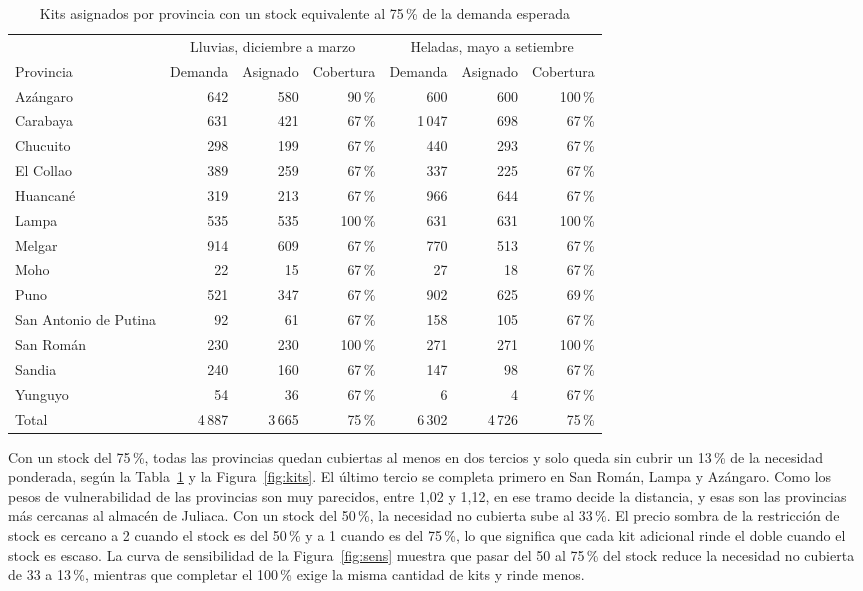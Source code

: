 \documentclass[12pt,a4paper]{article}
\begin{document}
\begin{table}[H]\centering\small
\caption{Kits asignados por provincia con un stock equivalente al 75\,\% de la demanda esperada}\label{tab:kits}
\begin{tabular}{lrrrrrr}
\toprule
 & \multicolumn{3}{c}{Lluvias, diciembre a marzo} & \multicolumn{3}{c}{Heladas, mayo a setiembre} \\
\cmidrule(lr){2-4}\cmidrule(lr){5-7}
Provincia & Demanda & Asignado & Cobertura & Demanda & Asignado & Cobertura \\
\midrule
Azángaro & 642 & 580 & 90\,\% & 600 & 600 & 100\,\% \\
Carabaya & 631 & 421 & 67\,\% & 1\,047 & 698 & 67\,\% \\
Chucuito & 298 & 199 & 67\,\% & 440 & 293 & 67\,\% \\
El Collao & 389 & 259 & 67\,\% & 337 & 225 & 67\,\% \\
Huancané & 319 & 213 & 67\,\% & 966 & 644 & 67\,\% \\
Lampa & 535 & 535 & 100\,\% & 631 & 631 & 100\,\% \\
Melgar & 914 & 609 & 67\,\% & 770 & 513 & 67\,\% \\
Moho & 22 & 15 & 67\,\% & 27 & 18 & 67\,\% \\
Puno & 521 & 347 & 67\,\% & 902 & 625 & 69\,\% \\
San Antonio de Putina & 92 & 61 & 67\,\% & 158 & 105 & 67\,\% \\
San Román & 230 & 230 & 100\,\% & 271 & 271 & 100\,\% \\
Sandia & 240 & 160 & 67\,\% & 147 & 98 & 67\,\% \\
Yunguyo & 54 & 36 & 67\,\% & 6 & 4 & 67\,\% \\
\midrule
Total & 4\,887 & 3\,665 & 75\,\% & 6\,302 & 4\,726 & 75\,\% \\
\bottomrule
\end{tabular}
\end{table}

Con un stock del 75\,\%, todas las provincias quedan cubiertas al menos en dos tercios y solo queda sin cubrir un
13\,\% de la necesidad ponderada, según la Tabla~\ref{tab:kits} y la Figura~\ref{fig:kits}. El último tercio se
completa primero en San Román, Lampa y Azángaro. Como los pesos de vulnerabilidad de las provincias son muy
parecidos, entre 1,02 y 1,12, en ese tramo decide la distancia, y esas son las provincias más cercanas al almacén de
Juliaca. Con un stock del 50\,\%, la necesidad no cubierta sube al 33\,\%. El precio sombra de la restricción de
stock es cercano a 2 cuando el stock es del 50\,\% y a 1 cuando es del 75\,\%, lo que significa que cada kit
adicional rinde el doble cuando el stock es escaso. La curva de sensibilidad de la Figura~\ref{fig:sens} muestra que
pasar del 50 al 75\,\% del stock reduce la necesidad no cubierta de 33 a 13\,\%, mientras que completar el 100\,\%
exige la misma cantidad de kits y rinde menos.
\end{document}
